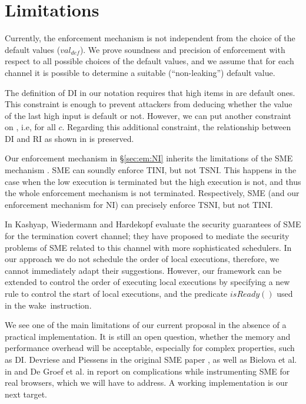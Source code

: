\documentclass[10pt,a4paper,oneside]{article}
\def\chnl{\ensuremath{c}}
\def\defVal{\ensuremath{val_{def}}}
\def\NWAKE{wake}
\def\NISREADY{\ensuremath{isReady}}
\def\isReady#1{\ensuremath{\NISREADY(#1)}}
\begin{document}
\section{Limitations}\label{sec:discussion:limitations}
Currently, the enforcement mechanism is not independent from the choice of the default values (\defVal). We prove soundness and precision of enforcement with respect to all possible choices of the default values, and we assume that for each channel it is possible to determine a suitable (``non-leaking'') default value.


The definition of DI in our notation requires that high items in  are default ones. This constraint is enough to prevent attackers from deducing whether the value of the last high input is default or not. However, we can put another constraint on , i.e,  for all \chnl. Regarding this additional constraint, the relationship between DI and RI as shown in \cite{MANT-00-CSF} is preserved.




Our enforcement mechanism in \S\ref{sec:em:NI} inherits the limitations of the SME mechanism \cite{Devr-Pies-10-IEEESP}. SME can soundly enforce TINI, but not TSNI. This happens in the case when the low execution is terminated but the high execution is not, and thus the whole enforcement mechanism is not terminated. Respectively, SME (and our enforcement mechanism for NI) can precisely enforce TSNI, but not TINI.








In \cite{Kash-Wied-Hard-11-SSP} Kashyap, Wiedermann and Hardekopf evaluate the security guarantees of SME for the termination covert channel; they have proposed to mediate the security problems of SME related to this channel with more sophisticated schedulers. In our approach we do not schedule the order of local executions, therefore, we cannot immediately adapt their suggestions. However, our framework can be extended to control the order of executing local executions by specifying a new rule to control the start of local executions, and the predicate \isReady{} used in the \NWAKE\ instruction.





 We see one of the main limitations of our current proposal in the absence of a practical implementation. It is still an open question, whether the memory and performance overhead will be acceptable, especially for complex properties, such as DI. Devriese and Piessens in the original SME paper \cite{Devr-Pies-10-IEEESP}, as well as Bielova et al. in \cite{Biel-etal-11-NSS} and De Groef et al. in \cite{DeGroef-etal-12-CCS} report on complications while instrumenting SME for real browsers, which we will have to address. A working implementation is our next target.
\end{document}
